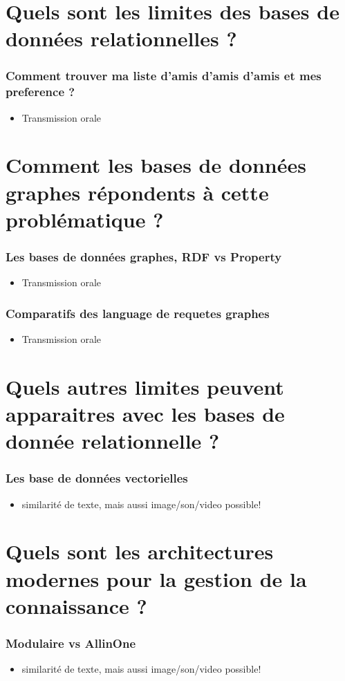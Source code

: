 \documentclass{beamer}
\begin{document}
\section{Quels sont les limites des bases de données relationnelles ?}

\begin{frame}
  \frametitle{Comment trouver ma liste d'amis d'amis d'amis et mes preference ?}
  \begin{itemize}
    \item Transmission orale
  \end{itemize}
\end{frame}


\section{Comment les bases de données graphes répondents à cette problématique ?}

\begin{frame}
  \frametitle{Les bases de données graphes, RDF vs Property}
  \begin{itemize}
    \item Transmission orale
  \end{itemize}
\end{frame}


\begin{frame}
  \frametitle{Comparatifs des language de requetes graphes}
  \begin{itemize}
    \item Transmission orale
  \end{itemize}
\end{frame}


\section{Quels autres limites peuvent apparaitres avec les bases de donnée relationnelle ?}

\begin{frame}
  \frametitle{Les base de données vectorielles}
  \begin{itemize}
    \item similarité de texte, mais aussi image/son/video possible!


  \end{itemize}
\end{frame}


\section{Quels sont les architectures modernes pour la gestion de la connaissance ?}

\begin{frame}
  \frametitle{Modulaire vs AllinOne}
  \begin{itemize}
    \item similarité de texte, mais aussi image/son/video possible!
  \end{itemize}
\end{frame}
\end{document}
